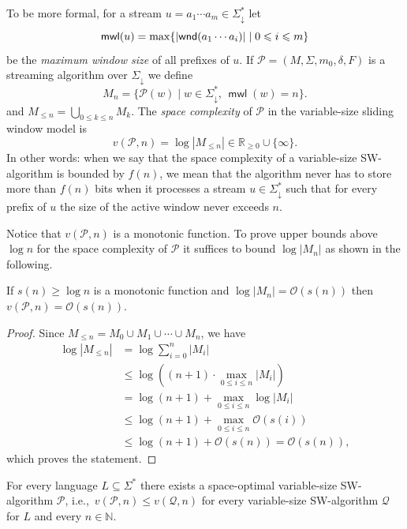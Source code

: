 \documentclass{theoretics}
\newcommand{\N}{\mathbb{N}}
\renewcommand{\O}{\mathcal{O}}
\renewcommand{\P}{\mathcal{P}}
\newcommand{\Q}{\mathcal{Q}}
\DeclareMathOperator{\wnd}{\mathsf{wnd}}
\DeclareMathOperator{\mwl}{\mathsf{mwl}}
\DeclarePairedDelimiter{\abs}{\lvert}{\rvert}
\renewcommand{\geq}{\geqslant}
\renewcommand{\leq}{\leqslant}
\renewcommand{\ge}{\geq}
\renewcommand{\le}{\leq}
\begin{document}
To be more formal, for a stream $u = a_1 \cdots a_m \in \Sigma_\downarrow^*$ 
let 
\[\mwl(u) = \max \{ \abs{\wnd(a_1 \cdots a_i)} \mid 0 \le i \le m\}\]
be the {\em maximum window size} of all prefixes of $u$.
If $\P = (M,\Sigma,m_0,\delta,F)$ is a streaming algorithm over $\Sigma_\downarrow$
we define
\begin{equation} \label{defM_n}
	M_n = \{ \P(w) \mid w \in \Sigma_\downarrow^*, \, \mwl(w) = n \}.
\end{equation}
and $M_{\le n} = \bigcup_{0 \le k \le n} M_k$.
The {\em space complexity} of $\P$ in the variable-size sliding window model is 
\[
	v(\P,n) = \log |M_{\le n}| \in \mathbb{R}_{\ge 0} \cup \{\infty\}.
\]
In other words: when we say that the space complexity of a variable-size SW-algorithm
is bounded by $f(n)$, we mean that the algorithm never has to store more than $f(n)$ bits
when it processes a stream $u \in \Sigma_\downarrow^*$ such that for every prefix of $u$
the size of the active window never exceeds $n$. 

Notice that $v(\P,n)$ is a monotonic function.
To prove upper bounds above $\log n$ for the space complexity of $\P$
it suffices to bound $\log |M_n|$ as shown in the following.

\begin{lemma}
	If $s(n) \ge \log n$ is a monotonic function
	and $\log |M_n| = \O(s(n))$ then $v(\P,n) = \O(s(n))$.
\end{lemma}
\begin{proof}
Since $M_{\le n} = M_{0} \cup M_{1} \cup \cdots \cup M_{n}$, we have
\begin{align*}
	\log |M_{\le n}| &= \log \sum_{i=0}^n |M_{i}| \\
	& \le \log \left( (n+1) \cdot \max_{0 \le i \le n} |M_{i}| \right) \\
	& = \log(n+1) + \max_{0 \le i \le n} \log |M_{i}| \\
	& \le \log(n+1) + \max_{0 \le i \le n} \O(s(i)) \\
	& \le \log(n+1) + \O(s(n)) = \O(s(n)),
\end{align*}
which proves the statement.
\end{proof}

\begin{lemma}
	\label{lem:optimal-vs}
	For every language $L \subseteq \Sigma^*$
	there exists a space-optimal variable-size SW-algorithm $\P$,
	i.e.,~$v(\P,n) \leq v(\Q,n)$ for every variable-size SW-algorithm $\Q$ for $L$ and every $n \in \N$.
\end{lemma}
\end{document}
